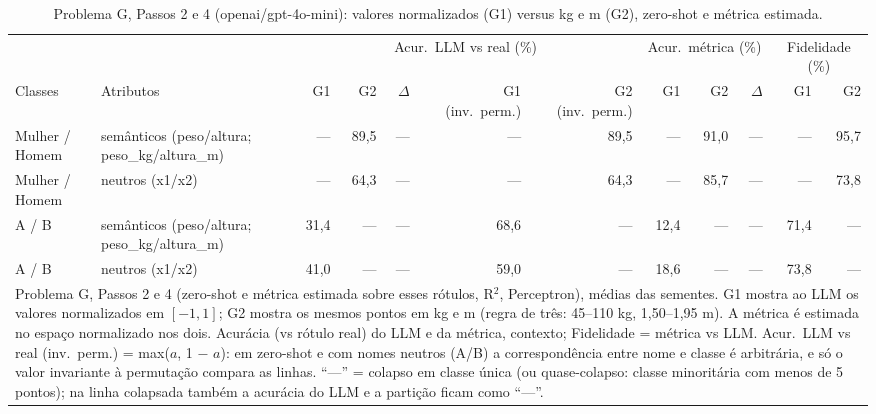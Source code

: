 \begin{table}[htbp]
\centering
\footnotesize
\caption{Problema G, Passos 2 e 4 (openai/gpt-4o-mini): valores normalizados (G1) versus kg e m (G2), zero-shot e métrica estimada.}
\label{tab:bloco3_G1_vs_G2_passos_2_e_4_gpt4mini}
\begin{tabular}{llrrrrrrrrrr}
\toprule
 &  & \multicolumn{5}{c}{Acur.\ LLM vs real (\%)} & \multicolumn{3}{c}{Acur.\ métrica (\%)} & \multicolumn{2}{c}{Fidelidade (\%)} \\ \cmidrule(lr){3-7} \cmidrule(lr){8-10} \cmidrule(lr){11-12}
Classes & Atributos & G1 & G2 & $\Delta$ & G1 (inv.\ perm.) & G2 (inv.\ perm.) & G1 & G2 & $\Delta$ & G1 & G2 \\
\midrule
Mulher / Homem & semânticos (peso/altura; peso\_kg/altura\_m) & — & 89,5 & — & — & 89,5 & — & 91,0 & — & — & 95,7 \\
Mulher / Homem & neutros (x1/x2) & — & 64,3 & — & — & 64,3 & — & 85,7 & — & — & 73,8 \\
A / B & semânticos (peso/altura; peso\_kg/altura\_m) & 31,4 & — & — & 68,6 & — & 12,4 & — & — & 71,4 & — \\
A / B & neutros (x1/x2) & 41,0 & — & — & 59,0 & — & 18,6 & — & — & 73,8 & — \\
\bottomrule
\multicolumn{12}{p{0.95\linewidth}}{\footnotesize Problema G, Passos 2 e 4 (zero-shot e métrica estimada sobre esses rótulos, R$^2$, Perceptron), médias das sementes. G1 mostra ao LLM os valores normalizados em $[-1, 1]$; G2 mostra os mesmos pontos em kg e m (regra de três: 45–110 kg, 1,50–1,95 m). A métrica é estimada no espaço normalizado nos dois. Acurácia (vs rótulo real) do LLM e da métrica, contexto; Fidelidade = métrica vs LLM. Acur.\ LLM vs real (inv.\ perm.) = max($a$, 1 $-$ $a$): em zero-shot e com nomes neutros (A/B) a correspondência entre nome e classe é arbitrária, e só o valor invariante à permutação compara as linhas. ``—'' = colapso em classe única (ou quase-colapso: classe minoritária com menos de 5 pontos); na linha colapsada também a acurácia do LLM e a partição ficam como ``—''.} \\
\end{tabular}
\end{table}

